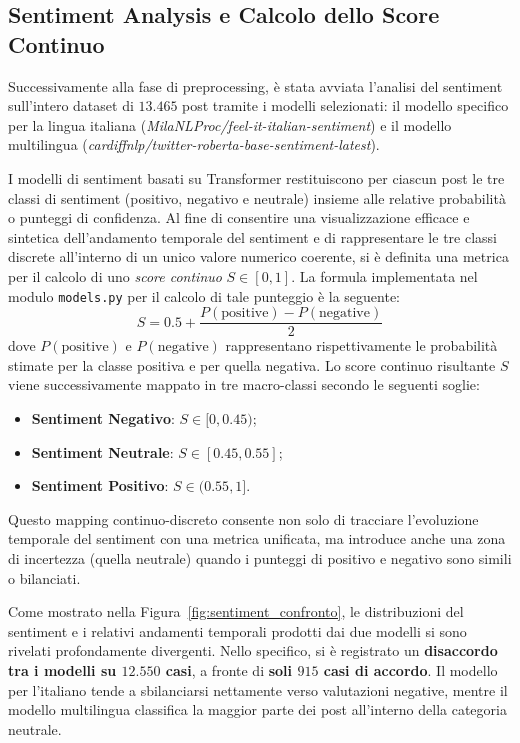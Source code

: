\documentclass[11pt]{article}
\begin{document}
\subsection{Sentiment Analysis e Calcolo dello Score Continuo}
\label{sec:score_continuo}
Successivamente alla fase di preprocessing, è stata avviata l'analisi del sentiment sull'intero dataset di $13.465$ post tramite i modelli selezionati: il modello specifico per la lingua italiana (\textit{MilaNLProc/feel-it-italian-sentiment}) e il modello multilingua (\textit{cardiffnlp/twitter-roberta-base-sentiment-latest}).

I modelli di sentiment basati su Transformer restituiscono per ciascun post le tre classi di sentiment (positivo, negativo e neutrale) insieme alle relative probabilità o punteggi di confidenza. Al fine di consentire una visualizzazione efficace e sintetica dell'andamento temporale del sentiment e di rappresentare le tre classi discrete all'interno di un unico valore numerico coerente, si è definita una metrica per il calcolo di uno \textit{score continuo} $S \in [0, 1]$. La formula implementata nel modulo \texttt{models.py} per il calcolo di tale punteggio è la seguente:
\begin{equation}
S = 0.5 + \frac{P(\text{positive}) - P(\text{negative})}{2}
\label{eq:score_continuo}
\end{equation}
dove $P(\text{positive})$ e $P(\text{negative})$ rappresentano rispettivamente le probabilità stimate per la classe positiva e per quella negativa. Lo score continuo risultante $S$ viene successivamente mappato in tre macro-classi secondo le seguenti soglie:
\begin{itemize}
    \item \textbf{Sentiment Negativo}: $S \in [0, 0.45)$;
    \item \textbf{Sentiment Neutrale}: $S \in [0.45, 0.55]$;
    \item \textbf{Sentiment Positivo}: $S \in (0.55, 1]$.
\end{itemize}

Questo mapping continuo-discreto consente non solo di tracciare l'evoluzione temporale del sentiment con una metrica unificata, ma introduce anche una zona di incertezza (quella neutrale) quando i punteggi di positivo e negativo sono simili o bilanciati.

Come mostrato nella Figura~\ref{fig:sentiment_confronto}, le distribuzioni del sentiment e i relativi andamenti temporali prodotti dai due modelli si sono rivelati profondamente divergenti. Nello specifico, si è registrato un \textbf{disaccordo tra i modelli su $12.550$ casi}, a fronte di \textbf{soli $915$ casi di accordo}. Il modello per l'italiano tende a sbilanciarsi nettamente verso valutazioni negative, mentre il modello multilingua classifica la maggior parte dei post all'interno della categoria neutrale.
\end{document}
